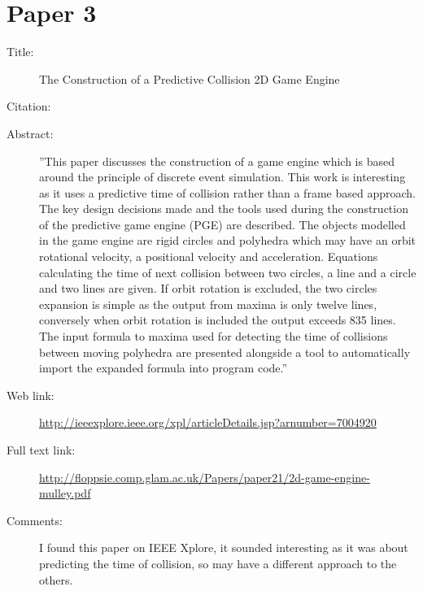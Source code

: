 \documentclass{scrartcl}
\begin{document}
\section*{Paper 3}
\begin{description}
\item[Title:] The Construction of a Predictive Collision 2D Game Engine
\item[Citation:] \cite{Mulley}
\item[Abstract:] ''This paper discusses the construction of a game engine which is based around the principle of discrete event simulation. This work is interesting as it uses a predictive time of collision rather than a frame based approach. The key design decisions made and the tools used during the construction of the predictive game engine (PGE) are described. The objects modelled in the game engine are rigid circles and polyhedra which may have an orbit rotational velocity, a positional velocity and acceleration. Equations calculating the time of next collision between two circles, a line and a circle and two lines are given. If orbit rotation is excluded, the two circles expansion is simple as the output from maxima is only twelve lines, conversely when orbit rotation is included the output exceeds 835 lines. The input formula to maxima used for detecting the time of collisions between moving polyhedra are presented alongside a tool to automatically import the expanded formula into program code.''
\item[Web link:] \url{http://ieeexplore.ieee.org/xpl/articleDetails.jsp?arnumber=7004920}
\item[Full text link:] \url{http://floppsie.comp.glam.ac.uk/Papers/paper21/2d-game-engine-mulley.pdf}
\item[Comments:] I found this paper on IEEE Xplore, it sounded interesting as it was about predicting the time of collision, so may have a different approach to the others. 
\end{description}
\end{document}
